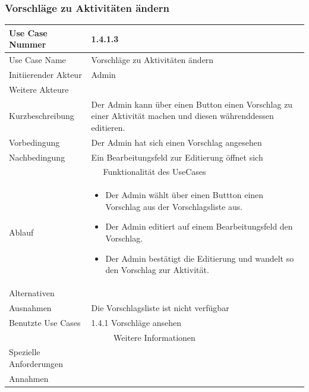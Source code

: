 \documentclass[10pt,a4paper]{article}
\begin{document}
	\subsubsection{Vorschl\"age zu Aktivit\"aten \"andern}
	\begin{tabular}{|l|p{.5\linewidth}|}
		\hline Use Case Nummer & 1.4.1.3 \\ 
		\hline Use Case Name & Vorschl\"age zu Aktivit\"aten \"andern \\ 
		\hline Initiierender Akteur & Admin \\
		\hline Weitere Akteure & \\
		\hline Kurzbeschreibung & Der Admin kann über einen Button einen Vorschlag zu einer Aktivit\"at machen und diesen währenddessen editieren. \\
		\hline Vorbedingung & Der Admin hat sich einen Vorschlag angesehen \\
		\hline Nachbedingung & Ein Bearbeitungsfeld zur Editierung öffnet sich\\
		\hline \multicolumn{2}{|c|}{Funktionalität des UseCases}\\
		\hline Ablauf & \begin{itemize}
			\item Der Admin wählt über einen Buttton einen Vorschlag aus der Vorschlagsliste aus.
			\item Der Admin editiert auf einem Bearbeitungsfeld den Vorschlag.
			\item Der Admin bestätigt die Editierung und wandelt so den Vorschlag zur Aktivit\"at.
		\end{itemize} \\
		\hline Alternativen &  \\
		\hline Ausnahmen & Die Vorschlagsliste ist nicht verf\"ugbar \\
		\hline Benutzte Use Cases & 1.4.1 Vorschl\"age ansehen \\
		\hline \multicolumn{2}{|c|}{Weitere Informationen} \\
		\hline Spezielle Anforderungen &  \\
		\hline Annahmen &  \\
		\hline
	\end{tabular}
\end{document}
